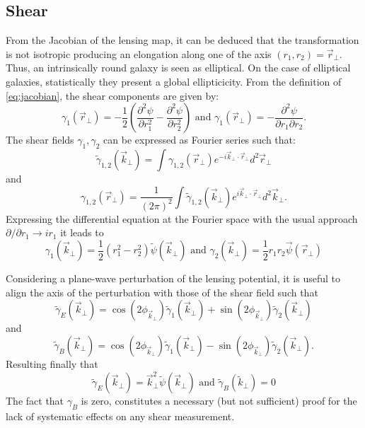 \subsection{Shear}
From the Jacobian of the lensing map, it can be deduced that the transformation is not isotropic producing an elongation along one of the axis $(r_1,r_2) = \vec r_\perp$. Thus, an intrinsically round galaxy is seen as elliptical. On the case of elliptical galaxies, statistically they present a global ellipticicity. From the definition of \autoref{eq:jacobian}, the shear components are given by:
\begin{equation}
\gamma_1(\vec r_\perp) = -\frac{1}{2}\left(\frac{\partial^2\psi}{\partial r_1^2}-\frac{\partial^2\psi}{\partial r_2^2}\right)\mbox{ and }\gamma_1(\vec r_\perp) = -\frac{\partial^2\psi}{\partial r_1\partial r_2}.
\end{equation}
The shear fields $\gamma_1,\gamma_2$ can be expressed as Fourier series such that:
\begin{equation}
\tilde \gamma_{1,2}(\vec k_\perp) = \int \gamma_{1,2}(\vec r_\perp)e^{-i\vec k_\perp\cdot\vec r_\perp}d^2\vec r_\perp
\end{equation}
and
\begin{equation}
\gamma_{1,2}(\vec r_\perp) = \frac{1}{(2\pi)^2}\int \tilde\gamma_{1,2}(\vec k_\perp)e^{i\vec k_\perp\cdot\vec r_\perp}d^2\vec k_\perp.
\end{equation}
Expressing the differential equation at the Fourier space with the usual approach $\partial/\partial r_1\rightarrow ir_1$ it leads to
\begin{equation}
\gamma_1(\vec k_\perp) = \frac{1}{2}(r_1^2-r_2^2)\tilde\psi(\vec k_\perp)\mbox{ and }\gamma_2(\vec k_\perp) = \frac{1}{2}r_1r_2\vec \psi(\vec r_\perp)
\end{equation}

Considering a plane-wave perturbation of the lensing potential, it is useful to align the axis of the perturbation with those of the shear field such that
\begin{equation}
\tilde \gamma_E(\vec k_\perp) = \cos(2\phi_{\vec k_\perp})\tilde \gamma_1(\vec k_\perp)+\sin(2\phi_{\vec k_\perp})\tilde \gamma_2(\vec k_\perp)
\end{equation}
and
\begin{equation}
\tilde \gamma_B(\vec k_\perp) = \cos(2\phi_{\vec k_\perp})\tilde \gamma_1(\vec k_\perp)-\sin(2\phi_{\vec k_\perp})\tilde \gamma_2(\vec k_\perp).
\end{equation}
Resulting finally that
\begin{equation}
\tilde\gamma_E(\vec k_\perp) = \vec k_\perp^2\tilde\psi(\vec k_\perp)\mbox{ and }\tilde\gamma_B(\tilde k_\perp) = 0
\end{equation}
The fact that $\gamma_B$ is zero, constitutes a necessary (but not sufficient) proof for the lack of systematic effects on any shear measurement.

